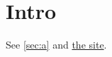 \documentclass{article}
\begin{document}
\section{Intro}\label{sec:a}
See \autoref{sec:a} and \href{https://example.org}{the site}.
\end{document}
